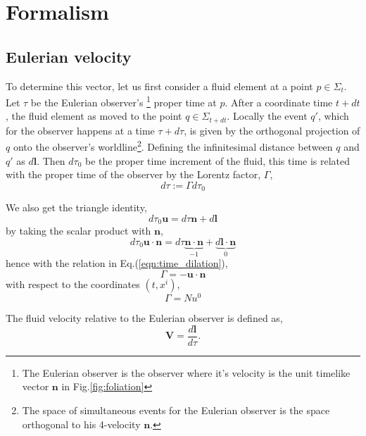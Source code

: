 \chapter{Formalism}

\section{Eulerian velocity}
\label{app:eulerian}


To determine this vector, let us first consider a fluid element at a point $p\in \Sigma_t$.
Let $\tau$ be the Eulerian observer's \footnote{The Eulerian observer is the observer where it's velocity is the unit timelike vector $\mathbf{n}$ in Fig.\ref{fig:foliation}} proper time at $p$.
After a coordinate time $t+dt$, the fluid element as moved to the point $q\in \Sigma_{t+dt}$. Locally the event $q'$, which for the observer happens at a time $\tau + d\tau$, is given by the orthogonal projection of $q$ onto the observer's worldline\footnote{The space of simultaneous events for the Eulerian observer is the space orthogonal to his 4-velocity $\mathbf{n}$.}.
Defining the infinitesimal distance between $q$ and $q'$ as $d\mathbf{l}$. Then $d\tau_0$ be the proper time increment of the fluid, this time is related with the proper time of the observer by the Lorentz factor, $\Gamma$,
\begin{equation}
    d\tau := \Gamma d\tau_0
    \label{eqn:time_dilation}
\end{equation}

We also get the triangle identity,
\begin{equation}
    d\tau_0 \mathbf{u} = d\tau \mathbf{n} + d\mathbf{l}
    \label{eqn:triangle_identity}
\end{equation}
by taking the scalar product with $\mathbf{n}$,
\begin{equation}
    d\tau_0 \mathbf{u} \cdot \mathbf{n} = d\tau \underbrace{\mathbf{n} \cdot \mathbf{n}}_{-1} + \underbrace{d\mathbf{l} \cdot \mathbf{n}}_{0}
\end{equation}
hence with the relation in Eq.(\ref{eqn:time_dilation}),
\begin{equation}
    \Gamma=-\mathbf{u} \cdot \mathbf{n}
\end{equation}
with respect to the coordinates $(t,x^i)$,
\begin{equation}
    \Gamma = Nu^0
\end{equation}

The fluid velocity relative to the Eulerian observer is defined as,
\begin{equation}
    \mathbf{V}=\frac{d\mathbf{l}}{d\tau}.
    \label{eqn:definition_eulerian_fluid_velocity}
\end{equation}

